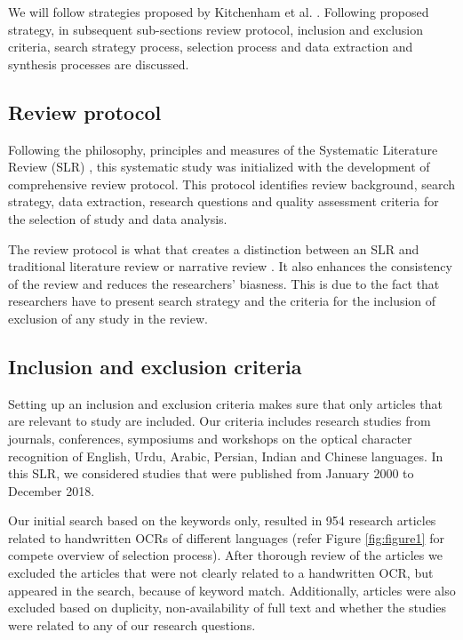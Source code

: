 \documentclass{article}
\begin{document}
We will follow strategies proposed by Kitchenham et al. \cite{kitchenham2010systematic}. Following proposed strategy, in subsequent sub-sections review protocol, inclusion and exclusion criteria, search strategy process, selection process and data extraction and synthesis processes are discussed. 



\subsection{Review protocol}


Following the philosophy, principles and measures of the Systematic Literature Review (SLR) \cite{kitchenham2010systematic}, this systematic study was initialized with the development of comprehensive review protocol. This protocol identifies review background, search strategy, data extraction, research questions and quality assessment criteria for the selection of study and data analysis. 

The review protocol is what that creates a distinction between an SLR and traditional literature review or narrative review  \cite{kitchenham2010systematic}. It also enhances the consistency of the review and reduces the researchers' biasness. This is due to the fact that researchers have to present search strategy and the criteria for the inclusion of exclusion of any study in the review.




\subsection{Inclusion and exclusion criteria}\label{inc-exc}

Setting up an inclusion and exclusion criteria makes sure that only articles that are relevant to study are included. Our criteria includes research studies from journals, conferences, symposiums and workshops on the optical character recognition of English, Urdu, Arabic, Persian, Indian and Chinese languages. In this SLR, we considered studies that were published from January 2000 to December 2018. 

Our initial search based on the keywords only, resulted in 954 research articles related to handwritten OCRs of different languages (refer Figure \ref{fig:figure1} for compete overview of selection process). After thorough review of the articles we excluded the articles that were not clearly related to a handwritten OCR, but appeared in the search, because of keyword match. Additionally, articles were also excluded based on duplicity, non-availability of full text and whether the studies were related to any of our research questions.
\end{document}
